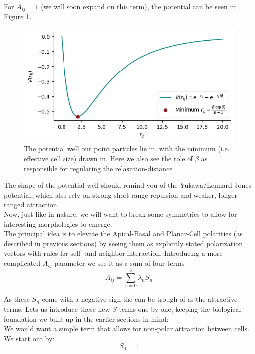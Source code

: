 For $A_{ij}=1$ (we will soon expand on this term), the potential can be seen in Figure \ref{fig:potential}.
\begin{figure}[H]
    \centering
    \includegraphics[width=1.\linewidth]{chapters/Theory/figures/potential.png}
    \caption{The potential well our point particles lie in, with the minimum (i.e. effective cell size) drawn in. Here we also see the role of $\beta$ as responsible for regulating the relaxation-distance}
    \label{fig:potential}
\end{figure}

The shape of the potential well should remind you of the Yukawa/Lennard-Jones potential, which also rely on strong short-range repulsion and weaker, longer-ranged attraction.\\
Now, just like in nature, we will want to break some symmetries to allow for interesting morphologies to emerge.\\
The principal idea is to elevate the Apical-Basal and Planar-Cell polarities (as described in previous sections) by seeing them as explicitly stated polarization vectors with rules for self- and neighbor interaction.
Introducing a more complicated $A_{ij}$-parameter we see it as a sum of four terms
\begin{equation}
    A_{ij}=\sum_{n=0}^{3}\lambda_n  S_n
\end{equation}

As these $S_n$ come with a negative sign the can be trough of as the attractive terms. Lets us introduce these new $S$-terms one by one, keeping the biological foundation we built up in the earlier sections in mind:\\

We would want a simple term that allows for non-polar attraction between cells. We start out by: 
\begin{equation*}
    S_0 = 1
\end{equation*}

